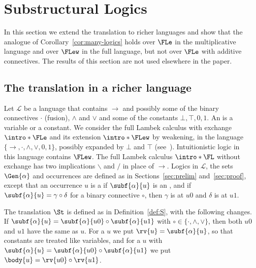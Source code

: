 \section{Substructural Logics}\label{sec:fl}

In this section we extend the translation to richer languages and show
that the analogue of Corollary~\ref{cor:many-logics} holds over
$\FLe$ in the multiplicative language and over $\FLew$
in the full language, but not over $\FLe$ with additive
connectives. The results of this section are not used elsewhere in the
paper.

\subsection{The translation in a richer language}

Let $\mathcal L$ be a language that contains $\to$ and possibly some of the
binary connectives $\cdot$ (fusion), $\wedge$ and $\vee$ and some of the
constants $\bot,\top,0,1$. \AP An  is a variable or a constant. \AP We
consider the full Lambek calculus with exchange $\intro*\FLe$ and its
extension $\intro*\FLew$ by weakening, in the language
$\{\to,\cdot,\wedge,\vee,0,1\}$, possibly expanded by $\bot$ and $\top$
(see~\cite{GJKO07}). Intuitionistic logic in this language contains
$\FLew$. The full Lambek calculus $\intro*\FL$ without exchange has two
implications $\backslash$ and $/$ in place of $\to$. Logics in $\mathcal L$, the sets $\Gen{\alpha}$ and
occurrences are defined as in Sections~\ref{sec:prelim}
and~\ref{sec:proof}, except that an occurrence $u$ is a  if
$\subf{\alpha}{u}$ is an , and if $\subf{\alpha}{u}=\gamma\circ\delta$ for a binary
connective $\circ$, then $\gamma$ is at $u0$ and $\delta$ is at $u1$.

The translation $\St$ is defined as in Definition~\ref{def:S}, with the
following changes. If $\subf{\alpha}{u}=\subf{\alpha}{u0}\circ\subf{\alpha}{u1}$ with
$\circ\in\{\cdot,\wedge,\vee\}$, then both $u0$ and $u1$ have the same
 as $u$. For a  $u$ we put $\rv{u}=\subf{\alpha}{u}$, so that constants
are treated like variables, and for a  $u$ with
$\subf{\alpha}{u}=\subf{\alpha}{u0}\circ\subf{\alpha}{u1}$ we put $\body{u}=\rv{u0}\circ \rv{u1}$.

